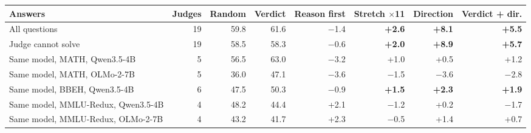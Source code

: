 \begin{tabular}{lr rr rrrr}
\toprule
Answers & Judges & Random & Verdict & Reason first & Stretch $\times$11 & Direction & Verdict + dir. \\
\midrule
All questions & 19 & 59.8 & 61.6 & $-$1.4 & \textbf{+2.6} & \textbf{+8.1} & \textbf{+5.5} \\
Judge cannot solve & 19 & 58.5 & 58.3 & $-$0.6 & \textbf{+2.0} & \textbf{+8.9} & \textbf{+5.7} \\
Same model, MATH, Qwen3.5-4B & 5 & 56.5 & 63.0 & $-$3.2 & +1.0 & +0.5 & +1.2 \\
Same model, MATH, OLMo-2-7B & 5 & 36.0 & 47.1 & $-$3.6 & $-$1.5 & $-$3.6 & $-$2.8 \\
Same model, BBEH, Qwen3.5-4B & 6 & 47.5 & 50.3 & $-$0.9 & \textbf{+1.5} & \textbf{+2.3} & \textbf{+1.9} \\
Same model, MMLU-Redux, Qwen3.5-4B & 4 & 48.2 & 44.4 & +2.1 & $-$1.2 & +0.2 & $-$1.7 \\
Same model, MMLU-Redux, OLMo-2-7B & 4 & 43.2 & 41.7 & +2.3 & $-$0.5 & +1.4 & +0.7 \\
\bottomrule
\end{tabular}
